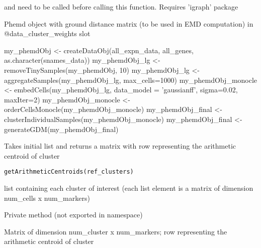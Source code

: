 \documentclass[a4paper]{book}
\begin{document}
%
\begin{Details}\relax
{} and  need to be called before calling this function. Requires 'igraph' package
\end{Details}
%
\begin{Value}
Phemd object with ground distance matrix (to be used in EMD computation) in @data\_cluster\_weights slot
\end{Value}
%
\begin{Examples}
\begin{ExampleCode}

my_phemdObj <- createDataObj(all_expn_data, all_genes, as.character(snames_data))
my_phemdObj_lg <- removeTinySamples(my_phemdObj, 10)
my_phemdObj_lg <- aggregateSamples(my_phemdObj_lg, max_cells=1000)
my_phemdObj_monocle <- embedCells(my_phemdObj_lg, data_model = 'gaussianff', sigma=0.02, maxIter=2)
my_phemdObj_monocle <- orderCellsMonocle(my_phemdObj_monocle)
my_phemdObj_final <- clusterIndividualSamples(my_phemdObj_monocle)
my_phemdObj_final <- generateGDM(my_phemdObj_final)

\end{ExampleCode}
\end{Examples}
%
\begin{Description}\relax
Takes initial list and returns a matrix with row  representing the arithmetic centroid of cluster 
\end{Description}
%
\begin{Usage}
\begin{verbatim}
getArithmeticCentroids(ref_clusters)
\end{verbatim}
\end{Usage}
%
\begin{Arguments}
\begin{ldescription}
\item[\code{ref\_clusters}] list containing each cluster of interest (each list element is a matrix of dimension num\_cells x num\_markers)
\end{ldescription}
\end{Arguments}
%
\begin{Details}\relax
Private method (not exported in namespace)
\end{Details}
%
\begin{Value}
Matrix of dimension num\_cluster x num\_markers; row  representing the arithmetic centroid of cluster 
\end{Value}
\end{document}

